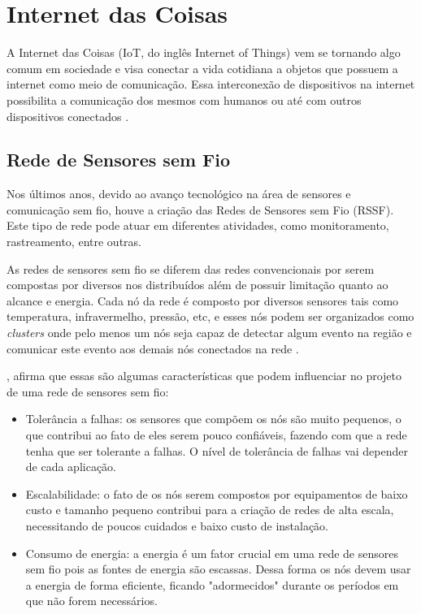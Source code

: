 \section{Internet das Coisas}

A Internet das Coisas (IoT, do inglês Internet of Things) vem se tornando algo comum em sociedade e visa conectar a vida cotidiana a objetos que possuem a internet como meio de comunicação. Essa interconexão de dispositivos na internet possibilita a comunicação dos mesmos com humanos ou até com outros dispositivos conectados \cite{leandro2017}.

\subsection{Rede de Sensores sem Fio}

Nos últimos anos, devido ao avanço tecnológico na área de sensores e comunicação sem fio, houve a criação das Redes de Sensores sem Fio (RSSF). Este tipo de rede pode atuar em diferentes atividades, como monitoramento, rastreamento, entre outras.

As redes de sensores sem fio se diferem das redes convencionais por serem compostas por diversos nos distribuídos além de possuir limitação quanto ao alcance e energia. Cada nó da rede é composto por diversos sensores tais como temperatura, infravermelho, pressão, etc, e esses nós podem ser organizados como \textit{clusters} onde pelo menos um nós seja capaz de detectar algum evento na região e comunicar este evento aos demais nós conectados na rede \cite{loureiro2003redes}.

, afirma que essas são algumas características que podem influenciar no projeto de uma rede de sensores sem fio:

\begin{itemize}[itemsep=0em]
    \item Tolerância a falhas: os sensores que compõem os nós são muito pequenos, o que contribui ao fato de eles serem pouco confiáveis, fazendo com que a rede tenha que ser tolerante a falhas. O nível de tolerância de falhas vai depender de cada aplicação. 
    \item Escalabilidade: o fato de os nós serem compostos por equipamentos de baixo custo e tamanho pequeno contribui para a criação de redes de alta escala, necessitando de poucos cuidados e baixo custo de instalação.
    \item Consumo de energia: a energia é um fator crucial em uma rede de sensores sem fio pois as fontes de energia são escassas. Dessa forma os nós devem usar a energia de forma eficiente, ficando "adormecidos" durante os períodos em que não forem necessários.
\end{itemize}

